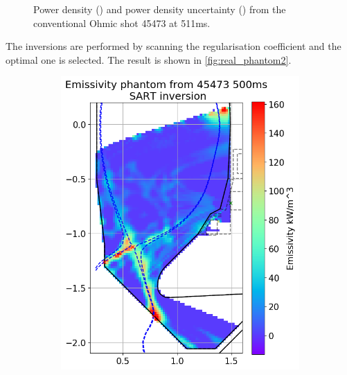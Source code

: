 \begin{figure}[!ht]
\begin{subfigure}{0.45\linewidth}
         \caption{}
         \label{fig:real_phantom1b}
     \end{subfigure}
    \caption{Power density () and power density uncertainty () from the conventional Ohmic shot 45473 at 511ms.}
    \label{fig:real_phantom1}
\end{figure}

The inversions are performed by scanning the regularisation coefficient and the optimal one is selected. The result is shown in \autoref{fig:real_phantom2}.
\begin{figure}[!ht]
     \begin{subfigure}{0.49\linewidth}
         \centering
         \includegraphics[trim={10 5 0 43},clip,width=\textwidth]{Chapters/chapter2/figs/inversion_comparison_emissivity_real_data_test-SART.png}
         \caption{}
         \label{fig:real_phantom2a}
     \end{subfigure}
     \hfill
     \begin{subfigure}{0.49\linewidth}
         \centering

\end{subfigure}
\end{figure}
